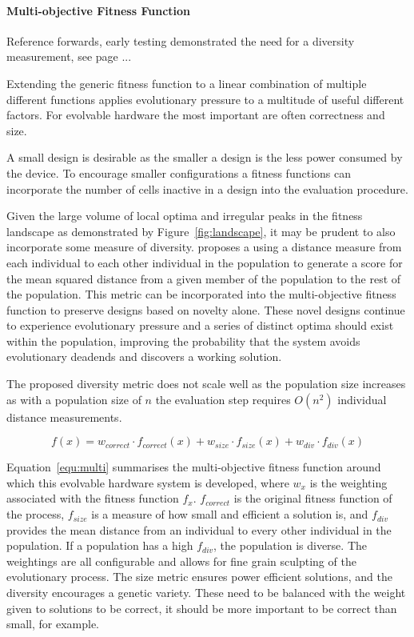 \paragraph{Multi-objective Fitness Function}
\todo Reference forwards, early testing demonstrated the need for a diversity
measurement, see page ...

Extending the generic fitness function to a linear combination of multiple different
functions applies evolutionary pressure to a multitude of useful different factors.
For evolvable hardware the most important are often correctness and size.

A small design is desirable as the smaller a design is the less power consumed
by the device. To encourage smaller configurations a fitness functions can
incorporate the number of cells inactive in a design into the evaluation
procedure.

Given the large volume of local optima and irregular peaks in the fitness
landscape as demonstrated by Figure~\ref{fig:landscape}, it may be prudent to
also incorporate some measure of diversity. \cite{deJong:2001:RBP:2955239.2955241}
proposes a using a
distance measure from each individual to each other individual in the population
to generate a score for the mean squared distance from a given member of the
population to the rest of the population. This metric can be incorporated into
the multi-objective fitness function to preserve designs based on novelty alone.
These novel designs continue to experience evolutionary pressure and a series
of distinct optima should exist within the population, improving the probability
that the system avoids evolutionary deadends and discovers a working solution.

The proposed diversity metric does not scale well as the population size increases
as with a population size of $n$ the evaluation step requires $O(n^2)$ individual
distance measurements.

\begin{equation}
	\label{equ:multi}
	f(x) = w_{correct} \cdot f_{correct}(x) + w_{size} \cdot f_{size}(x) +
	w_{div} \cdot f_{div}(x)
\end{equation}

Equation~\ref{equ:multi} summarises the multi-objective fitness function around
which this evolvable hardware system is developed, where $w_x$ is the weighting
associated with the fitness function $f_x$. $f_{correct}$ is the original fitness
function of the process, $f_{size}$ is a measure of how small and efficient a
solution is, and $f_{div}$ provides the mean distance from an individual to
every other individual in the population. If a population has a high $f_{div}$,
the population is diverse.
The weightings are all
configurable and allows for fine grain sculpting of the evolutionary process.
The size metric ensures power efficient solutions, and the diversity encourages
a genetic variety. These need to be balanced with the weight given to solutions
to be correct, it should be more important to be correct than small, for example.

